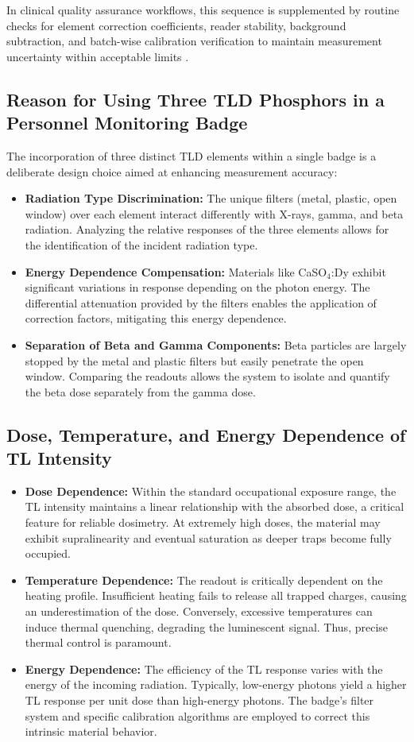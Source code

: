 In clinical quality assurance workflows, this sequence is supplemented by routine checks for element correction coefficients, reader stability, background subtraction, and batch-wise calibration verification to maintain measurement uncertainty within acceptable limits \cite{kry_aapm_2020,manna_use_2023}.

\subsection{Reason for Using Three TLD Phosphors in a Personnel Monitoring Badge}
The incorporation of three distinct TLD elements within a single badge is a deliberate design choice aimed at enhancing measurement accuracy:
\begin{itemize}
    \item \textbf{Radiation Type Discrimination:} The unique filters (metal, plastic, open window) over each element interact differently with X-rays, gamma, and beta radiation. Analyzing the relative responses of the three elements allows for the identification of the incident radiation type.
    \item \textbf{Energy Dependence Compensation:} Materials like CaSO$_4$:Dy exhibit significant variations in response depending on the photon energy. The differential attenuation provided by the filters enables the application of correction factors, mitigating this energy dependence.
    \item \textbf{Separation of Beta and Gamma Components:} Beta particles are largely stopped by the metal and plastic filters but easily penetrate the open window. Comparing the readouts allows the system to isolate and quantify the beta dose separately from the gamma dose.
\end{itemize}

\subsection{Dose, Temperature, and Energy Dependence of TL Intensity}
\begin{itemize}
    \item \textbf{Dose Dependence:} Within the standard occupational exposure range, the TL intensity maintains a linear relationship with the absorbed dose, a critical feature for reliable dosimetry. At extremely high doses, the material may exhibit supralinearity and eventual saturation as deeper traps become fully occupied.
    \item \textbf{Temperature Dependence:} The readout is critically dependent on the heating profile. Insufficient heating fails to release all trapped charges, causing an underestimation of the dose. Conversely, excessive temperatures can induce thermal quenching, degrading the luminescent signal. Thus, precise thermal control is paramount.
    \item \textbf{Energy Dependence:} The efficiency of the TL response varies with the energy of the incoming radiation. Typically, low-energy photons yield a higher TL response per unit dose than high-energy photons. The badge's filter system and specific calibration algorithms are employed to correct this intrinsic material behavior.
\end{itemize}

